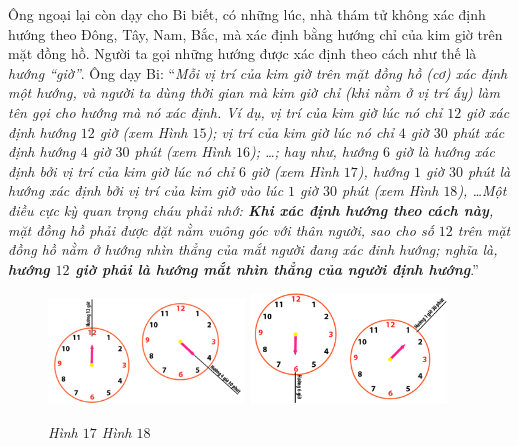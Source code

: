 	Ông ngoại lại còn dạy cho Bi biết, có những lúc, nhà thám tử không xác định hướng theo Đông, Tây, Nam, Bắc, mà xác định bằng hướng chỉ của kim giờ trên mặt đồng hồ. Người ta gọi những hướng được xác định theo cách như thế là \textit{hướng “giờ”}. Ông dạy Bi:
	\vskip 0.1cm
	“\textit{Mỗi vị trí của kim giờ trên mặt đồng hồ (cơ) xác định một hướng, và người ta dùng thời gian mà kim giờ chỉ (khi nằm ở vị trí ấy) làm tên gọi cho hướng mà nó xác định. Ví dụ, vị trí của kim giờ lúc nó chỉ $12$ giờ xác định hướng $12$ giờ (xem Hình $15$); vị trí của kim giờ lúc nó chỉ $4$ giờ $30$ phút xác định hướng $4$ giờ $30$ phút (xem Hình $16$); \ldots; hay như, hướng $6$ giờ là hướng xác định bởi vị trí của kim giờ lúc nó chỉ $6$ giờ (xem Hình $17$), hướng $1$ giờ $30$ phút là hướng xác định bởi vị trí của kim giờ vào lúc $1$ giờ $30$ phút (xem Hình $18$), \ldots Một điều cực kỳ quan trọng cháu phải nhớ: \textbf{\color{toancuabi}Khi xác định hướng theo cách này}, mặt đồng hồ phải được đặt nằm vuông góc với thân người, sao cho số $12$ trên mặt đồng hồ nằm ở hướng nhìn thẳng của mắt người đang xác đinh hướng; nghĩa là, \textbf{\color{toancuabi}hướng $12$ giờ phải là hướng mắt nhìn thẳng của người định hướng}}.”
		\begin{figure}[H]
		\centering
		\vspace*{4pt}
		\captionsetup{labelformat= empty, justification=centering}
		\includegraphics[width=0.465\textwidth]{pic15}
		\includegraphics[width=0.465\textwidth]{pic16}
		\caption{\small\textit{Hình $17$ \hspace*{70pt} Hình $18$}}
		\vspace*{-10pt}
	\end{figure}
